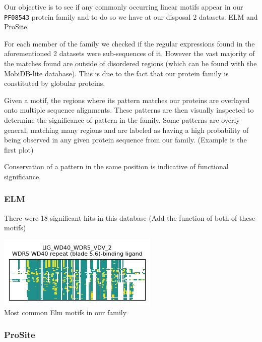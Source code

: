 \documentclass[10pt,twocolumn,letterpaper]{article}
\begin{document}
Our objective is to see if any commonly occurring linear motifs appear in our \texttt{PF08543} protein family and to do so we have at our disposal 2 datasets: ELM and ProSite.

For each member of the family we checked if the regular expressions found in the aforementioned 2 datasets were sub-sequences of it. However the vast majority of the matches found are outside of disordered regions (which can be found with the MobiDB-lite database). This is due to the fact that our protein family is constituted by globular proteins.

Given a motif, the regions where its pattern matches our proteins are overlayed onto multiple sequence alignments. These patterns are then visually inspected to determine the significance of pattern in the family.
Some patterns are overly general, matching many regions and are labeled as having a high probability of being observed in any given protein sequence from our family. (Example is the first plot)

Conservation of a pattern in the same position is indicative of functional significance.

\subsubsection{ELM}

There were 18 significant hits in this database
(Add the function of both of these motifs)

\begin{center}
    \includegraphics[scale=1]{report/img/Elm.png} \\
    \small{Most common Elm motifs in our family}
\end{center}


\subsubsection{ProSite}
\end{document}
